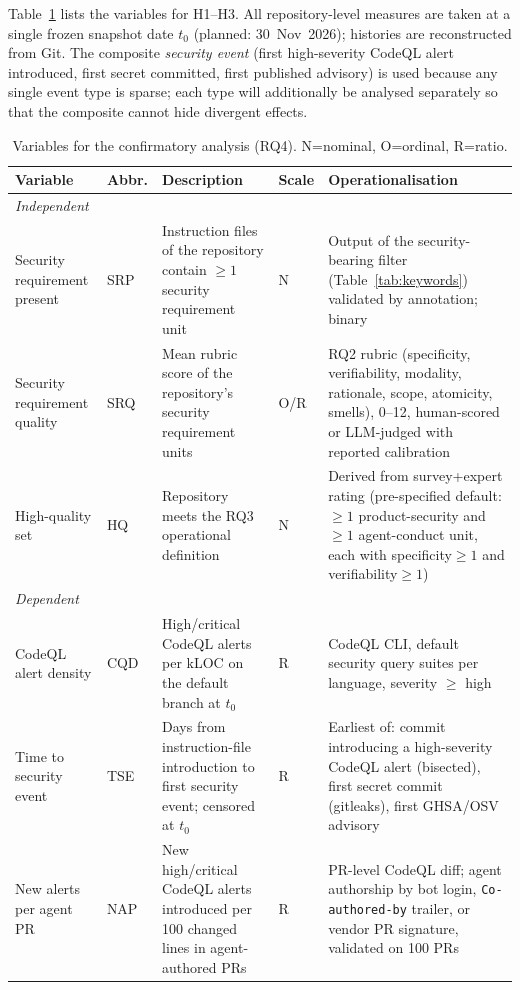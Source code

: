 \documentclass[10pt,conference]{IEEEtran}
\begin{document}
Table~\ref{tab:vars} lists the variables for H1--H3. All repository-level measures are taken at a single frozen snapshot date $t_0$ (planned: 30~Nov~2026); histories are reconstructed from Git. The composite \emph{security event} (first high-severity CodeQL alert introduced, first secret committed, first published advisory) is used because any single event type is sparse; each type will additionally be analysed separately so that the composite cannot hide divergent effects.

\begin{table}[t]
\caption{Variables for the confirmatory analysis (RQ4). N=nominal, O=ordinal, R=ratio.}
\label{tab:vars}
\centering\small
\begin{tabular}{p{1.9cm}p{1.2cm}p{5.6cm}p{0.6cm}p{6.4cm}}
\toprule
Variable & Abbr. & Description & Scale & Operationalisation \\
\midrule
\multicolumn{5}{l}{\emph{Independent}}\\
Security requirement present & SRP & Instruction files of the repository contain $\geq1$ security requirement unit & N & Output of the security-bearing filter (Table~\ref{tab:keywords}) validated by annotation; binary \\
Security requirement quality & SRQ & Mean rubric score of the repository's security requirement units & O/R & RQ2 rubric (specificity, verifiability, modality, rationale, scope, atomicity, smells), 0--12, human-scored or LLM-judged with reported calibration \\
High-quality set & HQ & Repository meets the RQ3 operational definition & N & Derived from survey+expert rating (pre-specified default: $\geq1$ product-security and $\geq1$ agent-conduct unit, each with specificity$\geq1$ and verifiability$\geq1$) \\
\midrule
\multicolumn{5}{l}{\emph{Dependent}}\\
CodeQL alert density & CQD & High/critical CodeQL alerts per kLOC on the default branch at $t_0$ & R & CodeQL CLI, default security query suites per language, severity $\geq$ high \\
Time to security event & TSE & Days from instruction-file introduction to first security event; censored at $t_0$ & R & Earliest of: commit introducing a high-severity CodeQL alert (bisected), first secret commit (gitleaks), first GHSA/OSV advisory \\
New alerts per agent PR & NAP & New high/critical CodeQL alerts introduced per 100 changed lines in agent-authored PRs & R & PR-level CodeQL diff; agent authorship by bot login, \texttt{Co-authored-by} trailer, or vendor PR signature, validated on 100 PRs \\

\end{tabular}
\end{table}
\end{document}
